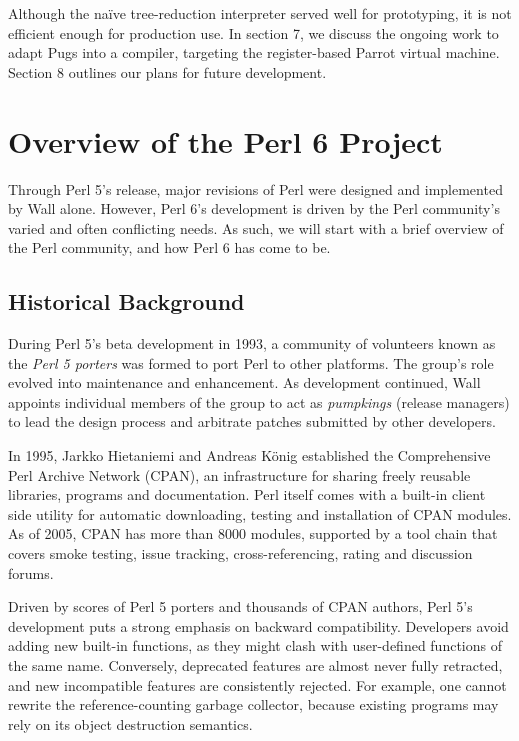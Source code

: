 \documentclass[]{sigplanconf}
\begin{document}
Although the na\"ive tree-reduction interpreter served well for prototyping,
it is not efficient enough for production use.  In section 7, we discuss the
ongoing work to adapt Pugs into a compiler, targeting the register-based Parrot
virtual machine.  Section 8 outlines our plans for future development.


\section{Overview of the Perl 6 Project}
\label{sec:perl6overview}

Through Perl 5's release, major revisions of Perl were designed and implemented
by Wall alone.  However, Perl 6's development is driven by the Perl community's
varied and often conflicting needs.  As such, we will start with a brief
overview of the Perl community, and how Perl 6 has come to be.

\subsection{Historical Background}

During Perl 5's beta development in 1993, a community of volunteers known as
the \emph{Perl 5 porters} was formed to port Perl to other platforms.  The group's
role evolved into maintenance and enhancement.  As development continued, Wall
appoints individual members of the group to act as \emph{pumpkings} (release
managers) to lead the design process and arbitrate patches submitted by other
developers.

In 1995, Jarkko Hietaniemi and Andreas K\"onig established the Comprehensive Perl
Archive Network (CPAN), an infrastructure for sharing freely reusable
libraries, programs and documentation.  Perl itself comes with a built-in client
side utility for automatic downloading, testing and installation of CPAN
modules.  As of 2005, CPAN has more than 8000 modules, supported by a tool chain
that covers smoke testing, issue tracking, cross-referencing, rating and
discussion forums.

Driven by scores of Perl 5 porters and thousands of CPAN authors, Perl 5's
development puts a strong emphasis on backward compatibility.  Developers
avoid adding new built-in functions, as they might clash with user-defined
functions of the same name.  Conversely, deprecated features are almost never
fully retracted, and new incompatible features are consistently rejected.
For example, one cannot rewrite the reference-counting garbage collector,
because existing programs may rely on its object destruction semantics.
\end{document}
